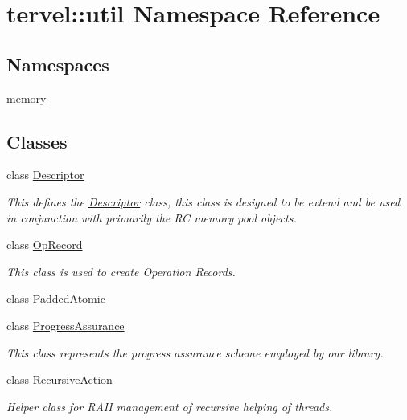 \hypertarget{namespacetervel_1_1util}{}\section{tervel\+:\+:util Namespace Reference}
\label{namespacetervel_1_1util}
\subsection*{Namespaces}
\begin{DoxyCompactItemize}
\item 
 \hyperlink{namespacetervel_1_1util_1_1memory}{memory}
\end{DoxyCompactItemize}
\subsection*{Classes}
\begin{DoxyCompactItemize}
\item 
class \hyperlink{classtervel_1_1util_1_1_descriptor}{Descriptor}
\begin{DoxyCompactList}\small\item\em This defines the \hyperlink{classtervel_1_1util_1_1_descriptor}{Descriptor} class, this class is designed to be extend and be used in conjunction with primarily the R\+C memory pool objects. \end{DoxyCompactList}\item 
class \hyperlink{classtervel_1_1util_1_1_op_record}{Op\+Record}
\begin{DoxyCompactList}\small\item\em This class is used to create Operation Records. \end{DoxyCompactList}\item 
class \hyperlink{classtervel_1_1util_1_1_padded_atomic}{Padded\+Atomic}
\item 
class \hyperlink{classtervel_1_1util_1_1_progress_assurance}{Progress\+Assurance}
\begin{DoxyCompactList}\small\item\em This class represents the progress assurance scheme employed by our library. \end{DoxyCompactList}\item 
class \hyperlink{classtervel_1_1util_1_1_recursive_action}{Recursive\+Action}
\begin{DoxyCompactList}\small\item\em Helper class for R\+A\+I\+I management of recursive helping of threads. \end{DoxyCompactList}\end{DoxyCompactItemize}
